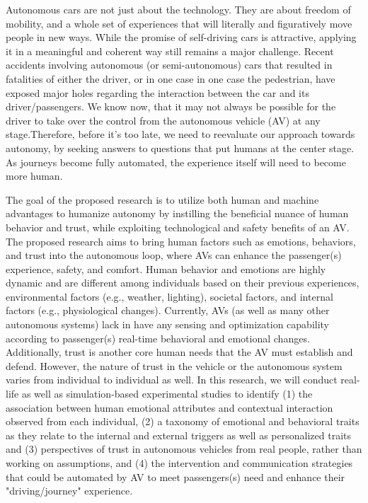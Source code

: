 

Autonomous cars are not just about the technology. They are about freedom of mobility, and a whole set of experiences that will literally and figuratively move people in new ways.
While the promise of self-driving cars is attractive, applying it in a meaningful and coherent way still remains a major challenge. Recent accidents involving autonomous (or semi-autonomous) cars that resulted in fatalities of either the driver, or in one case in one case the pedestrian, have exposed major holes regarding the interaction between the car and its driver/passengers. We know now, that it may not always be possible for the driver to take over the control from the autonomous vehicle (AV) at any stage.Therefore, before it’s too late, we need to reevaluate our approach towards autonomy, by seeking answers to questions that put humans at the center stage. As journeys become fully automated, the experience itself will need to become more human. 

The goal of the proposed research is to utilize both human and machine advantages to humanize autonomy  by instilling the beneficial nuance of human behavior and trust, while exploiting technological and safety benefits of an AV. The proposed research aims to bring human factors such as emotions, behaviors, and trust into the autonomous loop, where AVs can enhance the passenger(s) experience, safety, and comfort. Human behavior and emotions are highly dynamic and are different among individuals based on their previous experiences, environmental factors (e.g., weather, lighting), societal factors, and internal factors (e.g., physiological changes). Currently, AVs (as well as many other autonomous systems) lack in have any sensing and optimization capability according to passenger(s) real-time behavioral and emotional changes. Additionally, trust is another core human needs that the AV must establish and defend. However, the nature of trust in the vehicle or the autonomous system varies from individual to individual as well. In this research, we will conduct real-life as well as simulation-based experimental studies to identify (1)  the association between human emotional attributes and contextual interaction observed from each individual, (2) a taxonomy of emotional and behavioral traits as they relate to the internal and external triggers as well as personalized traits and (3) perspectives of trust in autonomous vehicles from real people, rather than working on assumptions, and (4) the intervention and communication strategies that could be automated by AV to meet passengers(s) need and enhance their "driving/journey" experience.


